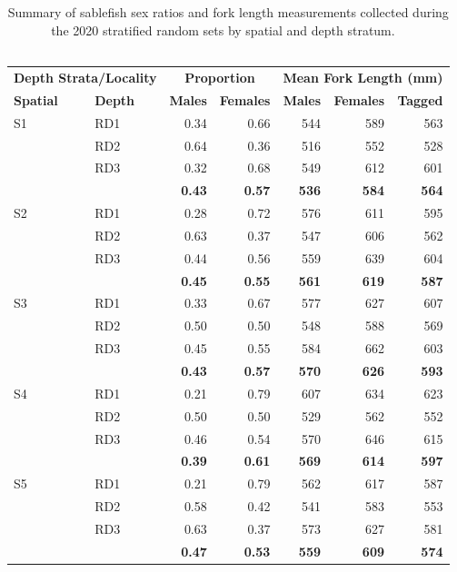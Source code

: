 \documentclass[12pt]{article}\usepackage[]{graphicx}\usepackage[]{color}
\begin{document}
\begin{table}[!h]

\caption{\label{tab:table3}Summary of sablefish sex ratios and fork length measurements collected during the 2020 stratified random sets by spatial and depth stratum. ~\\
\hspace*{0.333em}\\}
\fontsize{9}{11}\selectfont
\begin{tabular}[t]{llrrrrr}
\toprule
\multicolumn{2}{c}{\textbf{Depth Strata/Locality}} & \multicolumn{2}{c}{\textbf{Proportion}} & \multicolumn{3}{c}{\textbf{Mean Fork Length (mm)}} \\
\cmidrule(l{3pt}r{3pt}){1-2} \cmidrule(l{3pt}r{3pt}){3-4} \cmidrule(l{3pt}r{3pt}){5-7}
\textbf{Spatial} & \textbf{Depth} & \textbf{Males} & \textbf{Females} & \textbf{Males} & \textbf{Females} & \textbf{Tagged}\\
\midrule
S1 & RD1 & 0.34 & 0.66 & 544 & 589 & 563\\
 & RD2 & 0.64 & 0.36 & 516 & 552 & 528\\
 & RD3 & 0.32 & 0.68 & 549 & 612 & 601\\
\midrule
\textbf{} & \textbf{} & \textbf{0.43} & \textbf{0.57} & \textbf{536} & \textbf{584} & \textbf{564}\\
\midrule
S2 & RD1 & 0.28 & 0.72 & 576 & 611 & 595\\
 & RD2 & 0.63 & 0.37 & 547 & 606 & 562\\
 & RD3 & 0.44 & 0.56 & 559 & 639 & 604\\
\midrule
\textbf{} & \textbf{} & \textbf{0.45} & \textbf{0.55} & \textbf{561} & \textbf{619} & \textbf{587}\\
\midrule
S3 & RD1 & 0.33 & 0.67 & 577 & 627 & 607\\
 & RD2 & 0.50 & 0.50 & 548 & 588 & 569\\
 & RD3 & 0.45 & 0.55 & 584 & 662 & 603\\
\midrule
\textbf{} & \textbf{} & \textbf{0.43} & \textbf{0.57} & \textbf{570} & \textbf{626} & \textbf{593}\\
\midrule
S4 & RD1 & 0.21 & 0.79 & 607 & 634 & 623\\
 & RD2 & 0.50 & 0.50 & 529 & 562 & 552\\
 & RD3 & 0.46 & 0.54 & 570 & 646 & 615\\
\midrule
\textbf{} & \textbf{} & \textbf{0.39} & \textbf{0.61} & \textbf{569} & \textbf{614} & \textbf{597}\\
\midrule
S5 & RD1 & 0.21 & 0.79 & 562 & 617 & 587\\
 & RD2 & 0.58 & 0.42 & 541 & 583 & 553\\
 & RD3 & 0.63 & 0.37 & 573 & 627 & 581\\
\midrule
\textbf{} & \textbf{} & \textbf{0.47} & \textbf{0.53} & \textbf{559} & \textbf{609} & \textbf{574}\\
\bottomrule
\end{tabular}
\end{table}
~\\
\hspace*{0.333em}\\
\end{document}
